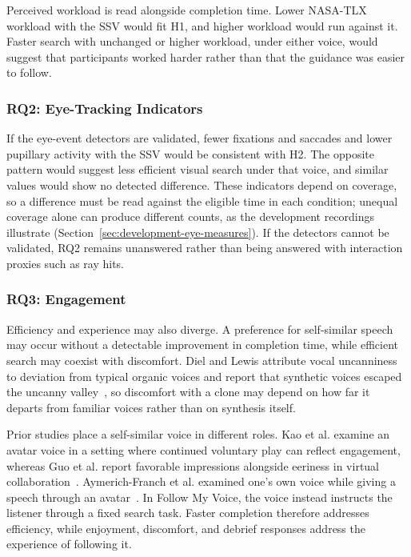 Perceived workload is read alongside completion time. Lower NASA-TLX workload with the SSV would fit H1, and higher workload would run against it. Faster search with unchanged or higher workload, under either voice, would suggest that participants worked harder rather than that the guidance was easier to follow.

\subsubsection{RQ2: Eye-Tracking Indicators}
If the eye-event detectors are validated, fewer fixations and saccades and lower pupillary activity with the SSV would be consistent with H2. The opposite pattern would suggest less efficient visual search under that voice, and similar values would show no detected difference. These indicators depend on coverage, so a difference must be read against the eligible time in each condition; unequal coverage alone can produce different counts, as the development recordings illustrate (Section~\ref{sec:development-eye-measures}). If the detectors cannot be validated, RQ2 remains unanswered rather than being answered with interaction proxies such as ray hits.

\subsubsection{RQ3: Engagement}
Efficiency and experience may also diverge. A preference for self-similar speech may occur without a detectable improvement in completion time, while efficient search may coexist with discomfort. Diel and Lewis attribute vocal uncanniness to deviation from typical organic voices and report that synthetic voices escaped the uncanny valley~\cite{diel2024uncanny}, so discomfort with a clone may depend on how far it departs from familiar voices rather than on synthesis itself.

Prior studies place a self-similar voice in different roles. Kao et al. examine an avatar voice in a setting where continued voluntary play can reflect engagement, whereas Guo et al. report favorable impressions alongside eeriness in virtual collaboration~\cite{kao2021selfsimilar,guo2024doppelganger}. Aymerich-Franch et al. examined one's own voice while giving a speech through an avatar~\cite{aymerich2012voicesimilarity}. In Follow My Voice, the voice instead instructs the listener through a fixed search task. Faster completion therefore addresses efficiency, while enjoyment, discomfort, and debrief responses address the experience of following it.

